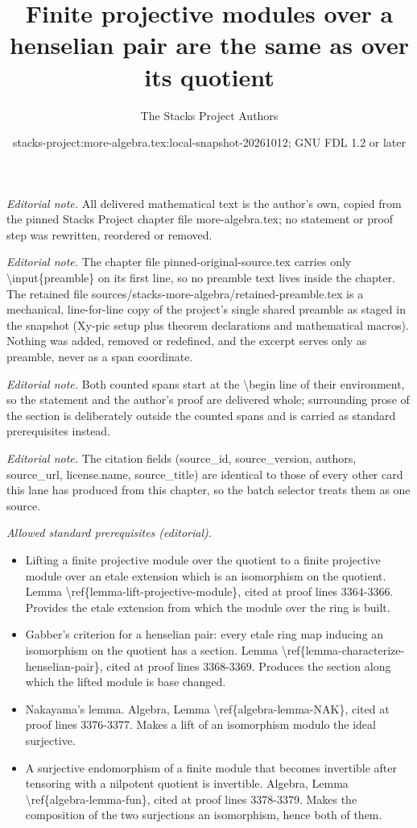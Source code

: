\documentclass[10pt,a4paper]{amsart}
\title{Finite projective modules over a henselian pair are the same as over its quotient}
\author{The Stacks Project Authors}
\date{stacks-project:more-algebra.tex:local-snapshot-20261012; GNU FDL 1.2 or later}
\theoremstyle{plain}
\theoremstyle{definition}
\theoremstyle{remark}
\numberwithin{equation}{subsection}
\begin{document}
\maketitle
\setcounter{subsection}{1}
\noindent\textit{Editorial note.} All delivered mathematical text is the author's own, copied from the pinned Stacks Project chapter file more-algebra.tex; no statement or proof step was rewritten, reordered or removed.\par\medskip
\noindent\textit{Editorial note.} The chapter file pinned-original-source.tex carries only \textbackslash{}input\{preamble\} on its first line, so no preamble text lives inside the chapter. The retained file sources/stacks-more-algebra/retained-preamble.tex is a mechanical, line-for-line copy of the project's single shared preamble as staged in the snapshot (Xy-pic setup plus theorem declarations and mathematical macros). Nothing was added, removed or redefined, and the excerpt serves only as preamble, never as a span coordinate.\par\medskip
\noindent\textit{Editorial note.} Both counted spans start at the \textbackslash{}begin line of their environment, so the statement and the author's proof are delivered whole; surrounding prose of the section is deliberately outside the counted spans and is carried as standard prerequisites instead.\par\medskip
\noindent\textit{Editorial note.} The citation fields (source\_id, source\_version, authors, source\_url, license.name, source\_title) are identical to those of every other card this lane has produced from this chapter, so the batch selector treats them as one source.\par\medskip
\noindent\textit{Allowed standard prerequisites (editorial).}\begin{itemize}
\item Lifting a finite projective module over the quotient to a finite projective module over an etale extension which is an isomorphism on the quotient. Lemma \textbackslash{}ref\{lemma-lift-projective-module\}, cited at proof lines 3364-3366. Provides the etale extension from which the module over the ring is built.
\item Gabber's criterion for a henselian pair: every etale ring map inducing an isomorphism on the quotient has a section. Lemma \textbackslash{}ref\{lemma-characterize-henselian-pair\}, cited at proof lines 3368-3369. Produces the section along which the lifted module is base changed.
\item Nakayama's lemma. Algebra, Lemma \textbackslash{}ref\{algebra-lemma-NAK\}, cited at proof lines 3376-3377. Makes a lift of an isomorphism modulo the ideal surjective.
\item A surjective endomorphism of a finite module that becomes invertible after tensoring with a nilpotent quotient is invertible. Algebra, Lemma \textbackslash{}ref\{algebra-lemma-fun\}, cited at proof lines 3378-3379. Makes the composition of the two surjections an isomorphism, hence both of them.
\end{itemize}\medskip
\end{document}
